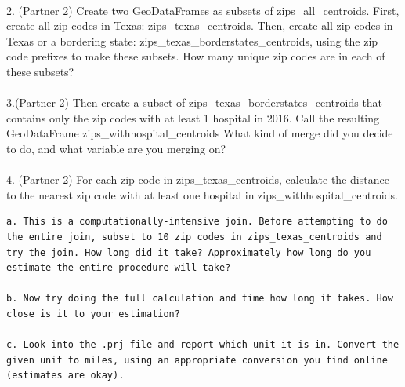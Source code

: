 \documentclass[
  letterpaper,
  DIV=11,
  numbers=noendperiod]{scrartcl}
\makeatletter
\let\oldparagraph\paragraph
\renewcommand{\paragraph}{
    \@ifstar
      \xxxParagraphStar
      \xxxParagraphNoStar
  }
\newcommand{\xxxParagraphStar}[1]{\oldparagraph*{#1}\mbox{}}
\newcommand{\xxxParagraphNoStar}[1]{\oldparagraph{#1}\mbox{}}
\makeatother
\begin{document}
\paragraph{2. (Partner 2) Create two GeoDataFrames as subsets of
zips\_all\_centroids. First, create all zip codes in Texas:
zips\_texas\_centroids. Then, create all zip codes in Texas or a
bordering state: zips\_texas\_borderstates\_centroids, using the zip
code prefixes to make these subsets. How many unique zip codes are in
each of these
subsets?}\label{partner-2-create-two-geodataframes-as-subsets-of-zips_all_centroids.-first-create-all-zip-codes-in-texas-zips_texas_centroids.-then-create-all-zip-codes-in-texas-or-a-bordering-state-zips_texas_borderstates_centroids-using-the-zip-code-prefixes-to-make-these-subsets.-how-many-unique-zip-codes-are-in-each-of-these-subsets}

\paragraph{3.(Partner 2) Then create a subset of
zips\_texas\_borderstates\_centroids that contains only the zip codes
with at least 1 hospital in 2016. Call the resulting GeoDataFrame
zips\_withhospital\_centroids What kind of merge did you decide to do,
and what variable are you merging
on?}\label{partner-2-then-create-a-subset-of-zips_texas_borderstates_centroids-that-contains-only-the-zip-codes-with-at-least-1-hospital-in-2016.-call-the-resulting-geodataframe-zips_withhospital_centroids-what-kind-of-merge-did-you-decide-to-do-and-what-variable-are-you-merging-on}

\paragraph{4. (Partner 2) For each zip code in zips\_texas\_centroids,
calculate the distance to the nearest zip code with at least one
hospital in
zips\_withhospital\_centroids.}\label{partner-2-for-each-zip-code-in-zips_texas_centroids-calculate-the-distance-to-the-nearest-zip-code-with-at-least-one-hospital-in-zips_withhospital_centroids.}

\begin{verbatim}
a. This is a computationally-intensive join. Before attempting to do the entire join, subset to 10 zip codes in zips_texas_centroids and try the join. How long did it take? Approximately how long do you estimate the entire procedure will take?

b. Now try doing the full calculation and time how long it takes. How close is it to your estimation?

c. Look into the .prj file and report which unit it is in. Convert the given unit to miles, using an appropriate conversion you find online (estimates are okay).
\end{verbatim}
\end{document}
